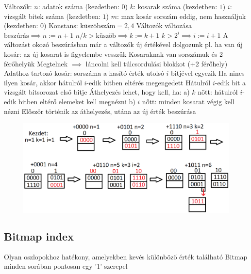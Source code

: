 \documentclass[12pt,a4paper]{article}
\begin{document}
\begin{outline}
	\1 Változók:
		\2 $n$: adatok száma (kezdetben: $0$)
		\2 $k$: kosarak száma (kezdetben: $1$)
		\2 $i$: vizsgált bitek száma (kezdetben: $1$)
		\2 $m$: max kosár sorszám eddig, nem használjuk (kezdetben: $0$)
	\1 Konstans: $\text{küszöbszám} = 2,4$
\pagebreak
	\1 Változók változása
		\2 $\text{beszúrás} \implies n := n + 1$
		\2 $n / k > \text{küszöb} \implies k := k + 1$
		\2 $k > 2^i \implies i := i + 1$
		\2 A változást okozó beszúrásban már a változók új értékével dolgozunk
			\3 pl. ha van új kosár: az új kosarat is figyelembe vesszük
	\1 Kosaraknak van sorszámuk és 2 férőhelyük
		\2 Megtelnek $\implies$ láncolni kell túlcsordulási blokkot (+2 férőhely)
	\1 Adathoz tartozó kosár: sorszáma a hasító érték utolsó $i$ bitjével egyezik
		\2 Ha nincs ilyen kosár, akkor hátulról $i$-edik bitben eltérés megengedett
			\3 Hátulról $i$-edik bit a vizsgált bitsorozat első bitje
	\1 Áthelyezés lehet, hogy kell, ha:
		\2 a) $k$ nőtt: hátulról $i$-edik bitben eltérő elemeket kell megnézni
		\2 b) $i$ nőtt: minden kosarat végig kell nézni
		\2 Először történik az áthelyezés, utána az új érték beszúrása
\end{outline}

\begin{figure}[h!]
	\centering
	\includegraphics[width=1\linewidth]{"lineáris hasítás"}
\end{figure}

\pagebreak

\subsection{Bitmap index}

\begin{outline}
	\1 Olyan oszlopokhoz hatékony, amelyekben kevés különböző érték található
	\1 Bitmap minden sorában pontosan egy '1' szerepel
\end{outline}
\end{document}
